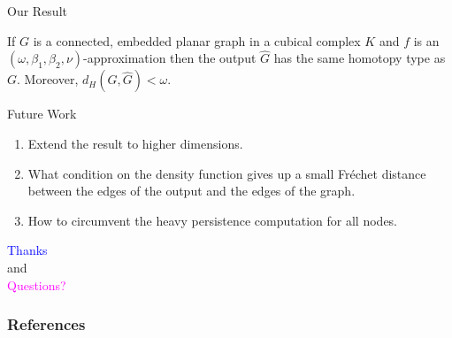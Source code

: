 \documentclass[9pt,sans-serif]{beamer}
\begin{document}
\begin{frame}{Our Result}

  \begin{theorem}{}
    If $G$ is a connected, embedded planar graph in a cubical complex $K$ and
    $f$ is an $(\omega,\beta_1,\beta_2,\nu)$-approximation then the output $\hat
    G$ has the same homotopy type as $G$. Moreover, $d_H(G,\hat G)<\omega$.
  \end{theorem}
\end{frame}

  
\begin{frame}{Future Work}  
  \begin{enumerate}
  \item Extend the result to higher dimensions.
  \item What condition on the density function gives up a small Fr\'echet
    distance between the edges of the output and the edges of the graph.
  \item How to circumvent the heavy persistence computation for all nodes.
  \end{enumerate}
\end{frame}

\begin{frame}
  \centering
  \Huge{\textcolor{blue}{Thanks}} \\
  and \\
  \textcolor{magenta}{Questions?}
\end{frame}

\begin{frame}[allowframebreaks]
        \frametitle{References}
        
        
\end{frame}
\end{document}
